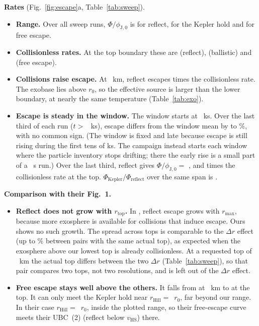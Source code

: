 \documentclass[10pt]{article}
\newcommand{\para}[1]{\textbf{#1}\hspace{0.5em}}
\newcommand{\rtop}{r_\mathrm{top}}
\newcommand{\rhill}{r_\mathrm{Hill}}
\begin{document}
\para{Rates} (Fig.~\ref{fig:escape}a, Table~\ref{tab:sweep}).
\begin{itemize}
  \item \textbf{Range.} Over all sweep runs, $\Phi/\phi_{\mathrm{J},0}$ is \phiOverJReflect{} for reflect, \phiOverJKepler{} for the Kepler hold and \phiOverJFree{} for free escape.
  \item \textbf{Collisionless rates.} At the top boundary these are \anReflectOverJ{} (reflect), \anBallisticOverJ{} (ballistic) and \anFreeOverJTop{} (free escape).
  \item \textbf{Collisions raise escape.} At \profZtop{}~km, reflect escapes \collEnhanceTop{} times the collisionless rate. The exobase lies above $r_0$, so the effective source is larger than the lower boundary, at nearly the same temperature (Table~\ref{tab:exo}).
  \item \textbf{Escape is steady in the window.} The window starts at \profWindowReflect{}~ks. Over the last third of each run ($t > $ \escLateStartKs{}~ks), escape differs from the window mean by \escDriftLo{} to \escDriftHi{}\%, with no common sign. (The window is fixed and late because escape is still rising during the first tens of ks. The campaign instead starts each window where the particle inventory stops drifting; there the early rise is a small part of a \campTend{}~s run.) Over the last third, reflect gives $\Phi/\phi_{\mathrm{J},0} = $ \escLateReflectRange{}, and \escLateCollEnhanceTop{} times the collisionless rate at the top. $\Phi_\mathrm{Kepler}/\Phi_\mathrm{reflect}$ over the same span is \sweepPhiRatioLateRange{}.
\end{itemize}

\para{Comparison with their Fig.~1.}
\begin{itemize}
  \item \textbf{Reflect does not grow with $\rtop$.} In \citet{cm21}, reflect escape grows with $r_\mathrm{max}$, because more exosphere is available for collisions that induce escape. Ours shows no such growth. The spread across tops is comparable to the $\Delta r$ effect (up to \drEffectMax{}\% between pairs with the same actual top), as expected when the exosphere above our lowest top is already collisionless. At a requested top of \drSkipZtop{}~km the actual top differs between the two $\Delta r$ (Table~\ref{tab:sweep}), so that pair compares two tops, not two resolutions, and is left out of the $\Delta r$ effect.
  \item \textbf{Free escape stays well above the others.} It falls from \phiOverJFreeLowZ{} at \phiOverJFreeLowZkm{}~km to \phiOverJFreeTop{} at the top. It can only meet the Kepler hold near $\rhill = $ \oHill{}\,$r_0$, far beyond our range. In their case $\rhill = $ \pHill{}\,$r_0$, inside the plotted range, so their free-escape curve meets their UBC~(2) (reflect below $v_\mathrm{HS}$) there.
\end{itemize}
\end{document}
